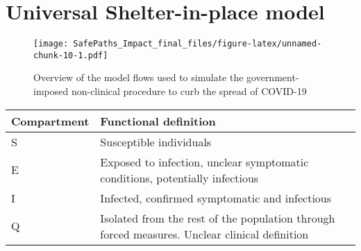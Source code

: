 \documentclass[]{article}
\begin{document}
\hypertarget{universal-shelter-in-place-model}{%
\section{Universal Shelter-in-place
model}\label{universal-shelter-in-place-model}}

\begin{figure}
\centering
\texttt{[image: SafePaths\_Impact\_final\_files/figure-latex/unnamed-chunk-10-1.pdf]}
\caption{Overview of the model flows used to simulate the
government-imposed non-clinical procedure to curb the spread of
COVID-19}
\end{figure}

\begin{longtable}[]{@{}ll@{}}
\toprule
\begin{minipage}[b]{0.11\columnwidth}\raggedright
Compartment\strut
\end{minipage} & \begin{minipage}[b]{0.83\columnwidth}\raggedright
Functional definition\strut
\end{minipage}\tabularnewline
\midrule
\endhead
\begin{minipage}[t]{0.11\columnwidth}\raggedright
S\strut
\end{minipage} & \begin{minipage}[t]{0.83\columnwidth}\raggedright
Susceptible individuals\strut
\end{minipage}\tabularnewline
\begin{minipage}[t]{0.11\columnwidth}\raggedright
E\strut
\end{minipage} & \begin{minipage}[t]{0.83\columnwidth}\raggedright
Exposed to infection, unclear symptomatic conditions, potentially
infectious\strut
\end{minipage}\tabularnewline
\begin{minipage}[t]{0.11\columnwidth}\raggedright
I\strut
\end{minipage} & \begin{minipage}[t]{0.83\columnwidth}\raggedright
Infected, confirmed symptomatic and infectious\strut
\end{minipage}\tabularnewline
\begin{minipage}[t]{0.11\columnwidth}\raggedright
Q\strut
\end{minipage} & \begin{minipage}[t]{0.83\columnwidth}\raggedright
Isolated from the rest of the population through forced measures.
Unclear clinical definition\strut

\end{minipage}
\end{longtable}
\end{document}
